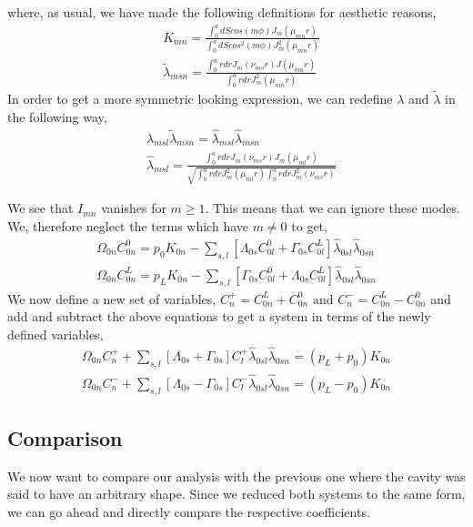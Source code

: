 \documentclass[a4paper,10pt]{article}
\begin{document}
where, as usual, we have made the following definitions for aesthetic reasons,
\begin{align}
 &K_{mn}=\frac{\int^a_0 dS cos(m\phi)J_m(\mu_{mn}r)}{\int^a_0 dS cos^2(m\phi)J^2_m(\mu_{mn}r)}\\
 &\widetilde{\lambda}_{msn}=\frac{\int^a_0 rdr J_m(\nu_{ms}r)J(\mu_{mn}r)}{\int^a_0 rdrJ^2_m(\mu_{mn}r)}
\end{align}
In order to get a more symmetric looking expression, we can redefine $\lambda$ and $\widetilde{\lambda}$
in the following way,
\begin{align}
 &\lambda_{msl}\widetilde{\lambda}_{msn}=\widehat{\lambda}_{msl}\widehat{\lambda}_{msn}\\
 &\widehat{\lambda}_{msl}=\frac{\int^a_0 rdrJ_m(\nu_{ms}r)J_m(\mu_{ml}r)}{\sqrt{\int^a_0 rdrJ^2_m(\mu_{ml}r)\int^a_0 rdrJ^2_m(\nu_{ms}r)}}
\end{align}

We see that $I_{mn}$ vanishes for $m\geq1$. This means that we can ignore these modes. We, therefore neglect
the terms which have $m\neq 0$ to get,
\begin{align}
 \Omega_{0n}C^0_{0n}=p_0K_{0n}-\sum_{s,l}\left[\Lambda_{0s}C^0_{0l}+\Gamma_{0s}C^L_{0l}\right]\widehat{\lambda}_{0sl}\widehat{\lambda}_{0sn}\\
 \Omega_{0n}C^L_{0n}=p_LK_{0n}-\sum_{s,l}\left[\Gamma_{0s}C^0_{0l}+\Lambda_{0s}C^L_{0l}\right]\widehat{\lambda}_{0sl}\widehat{\lambda}_{0sn}
\end{align}
We now define a new set of variables, $C_n^+=C_{0n}^L+C_{0n}^0$ and $C_n^-=C_{0n}^L-C_{0n}^0$ and add and subtract the above
equations to get a system in terms of the newly defined variables,
\begin{align}
 \Omega_{0n}C^+_n+\sum_{s,l}\left[\Lambda_{0s}+\Gamma_{0s}\right]C^+_{l}\widehat{\lambda}_{0sl}\widehat{\lambda}_{0sn}=(p_L+p_0)K_{0n}\\
 \Omega_{0n}C^-_n+\sum_{s,l}\left[\Lambda_{0s}-\Gamma_{0s}\right]C^-_{l}\widehat{\lambda}_{0sl}\widehat{\lambda}_{0sn}=(p_L-p_0)K_{0n}
\end{align}

\subsection{Comparison}
We now want to compare our analysis with the previous one where the cavity was said to 
have an arbitrary shape. Since we reduced both systems to the same form, we can go ahead
and directly compare the respective coefficients.
\end{document}

